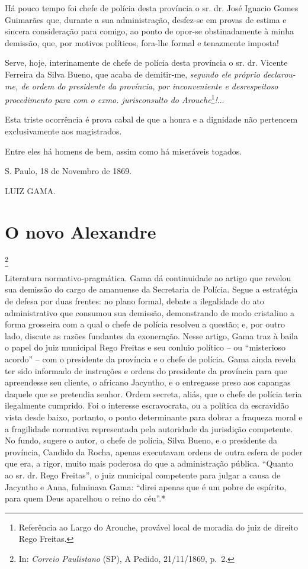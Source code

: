 Há pouco tempo foi chefe de polícia desta província o sr. dr. José
Ignacio Gomes Guimarães que, durante a sua administração, desfez-se em
provas de estima e sincera consideração para comigo, ao ponto de opor-se
obstinadamente à minha demissão, que, por motivos políticos, fora-lhe
formal e tenazmente imposta!

Serve, hoje, interinamente de chefe de polícia desta província o sr. dr.
Vicente Ferreira da Silva Bueno, que acaba de demitir-me, \emph{segundo
ele próprio declarou-me, de ordem do presidente da província, por
inconveniente e desrespeitoso procedimento para com o exmo.
jurisconsulto do Arouche}\footnote{Referência ao Largo do Arouche,
  provável local de moradia do juiz de direito Rego Freitas.}\emph{!}...

Esta triste ocorrência é prova cabal de que a honra e a dignidade não
pertencem exclusivamente aos magistrados.

Entre eles há homens de bem, assim como há miseráveis togados.

S. Paulo, 18 de Novembro de 1869.

LUIZ GAMA.

\chapter{O novo Alexandre}\footnote{In: \emph{Correio Paulistano} (SP), A
  Pedido, 21/11/1869, p.~2.}

\begin{didascalia}
Literatura normativo-pragmática. Gama dá continuidade ao artigo que
revelou sua demissão do cargo de amanuense da Secretaria de Polícia.
Segue a estratégia de defesa por duas frentes: no plano formal, debate a
ilegalidade do ato administrativo que consumou sua demissão,
demonstrando de modo cristalino a forma grosseira com a qual o chefe de
polícia resolveu a questão; e, por outro lado, discute as razões
fundantes da exoneração. Nesse artigo, Gama traz à baila o papel do juiz
municipal Rego Freitas e seu conluio político -- ou ``misterioso acordo''
-- com o presidente da província e o chefe de polícia. Gama ainda revela
ter sido informado de instruções e ordens do presidente da província
para que apreendesse seu cliente, o africano Jacyntho, e o entregasse
preso aos capangas daquele que se pretendia senhor. Ordem secreta,
aliás, que o chefe de polícia teria ilegalmente cumprido. Foi o
interesse escravocrata, ou a política da escravidão vista desde baixo,
portanto, o ponto determinante para dobrar a fraqueza moral e a
fragilidade normativa representada pela autoridade da jurisdição
competente. No fundo, sugere o autor, o chefe de polícia, Silva Bueno, e
o presidente da província, Candido da Rocha, apenas executavam ordens de
outra esfera de poder que era, a rigor, muito mais poderosa do que a
administração pública. ``Quanto ao sr. dr. Rego Freitas'', o juiz
municipal competente para julgar a causa de Jacyntho e Anna, fulminava
Gama: ``direi apenas que é um pobre de espírito, para quem Deus aparelhou
o reino do céu''.*
\end{didascalia}

